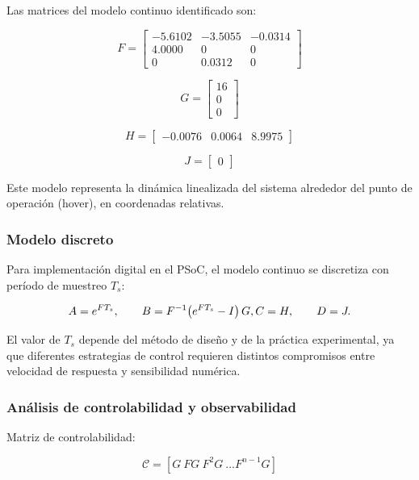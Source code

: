 Las matrices del modelo continuo identificado son:

\[
F =
\begin{bmatrix}
	-5.6102 & -3.5055 & -0.0314 \\
	4.0000  & 0       & 0       \\
	0       & 0.0312  & 0
\end{bmatrix}
\]

\[
G =
\begin{bmatrix}
	16 \\
	0 \\
	0
\end{bmatrix}
\]

\[
H =
\begin{bmatrix}
	-0.0076 & 0.0064 & 8.9975
\end{bmatrix}
\]

\[
J =
\begin{bmatrix}
	0
\end{bmatrix}
\]

Este modelo representa la dinámica linealizada del sistema
alrededor del punto de operación (hover),
en coordenadas relativas.

\subsubsection{Modelo discreto}

Para implementación digital en el PSoC,
el modelo continuo se discretiza con período de muestreo \(T_s\):

\[
A = e^{F T_s}, 
\qquad
B = F^{-1}\!\left(e^{F T_s} - I\right) G,
\qquad\\
C = H,
\qquad
D = J.
\]

El valor de \(T_s\) depende del método de diseño y de la práctica
experimental, ya que diferentes estrategias de control
requieren distintos compromisos entre velocidad de respuesta
y sensibilidad numérica.

\subsubsection{Análisis de controlabilidad y observabilidad}

Matriz de controlabilidad:

\[
\mathcal{C}=[G\ FG\ F^2G\ \dots F^{n-1}G]
\]

